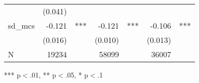\begin{table}[!h]
\begin{tabular}{lllllll}
  \multicolumn{1}{l}{} &
  \multicolumn{1}{r}{(0.041)} &
  \multicolumn{1}{l}{} \\
\multicolumn{1}{l}{sd\_mcs} &
  \multicolumn{1}{r}{-0.121} &
  \multicolumn{1}{l}{***} &
  \multicolumn{1}{r}{-0.121} &
  \multicolumn{1}{l}{***} &
  \multicolumn{1}{r}{-0.106} &
  \multicolumn{1}{l}{***} \\
\multicolumn{1}{l}{} &
  \multicolumn{1}{r}{(0.016)} &
  \multicolumn{1}{l}{} &
  \multicolumn{1}{r}{(0.010)} &
  \multicolumn{1}{l}{} &
  \multicolumn{1}{r}{(0.013)} &
  \multicolumn{1}{l}{} \\
\multicolumn{1}{l}{N} &
  \multicolumn{1}{r}{19234} &
  \multicolumn{1}{l}{} &
  \multicolumn{1}{r}{58099} &
  \multicolumn{1}{l}{} &
  \multicolumn{1}{r}{36007} &
  \multicolumn{1}{l}{} \\
\cline{1-7}
\end{tabular}

\footnotesize{
*** p$<$.01, ** p$<$.05, * p$<$.1
}
\end{table}
